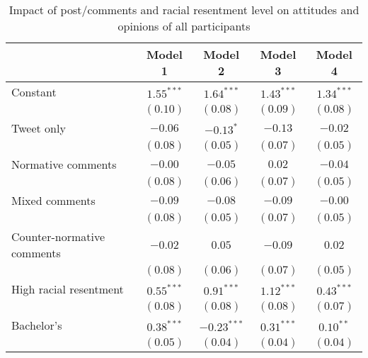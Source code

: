 
\begin{table}[h!]
\caption{Impact of post/comments and racial resentment level on attitudes and opinions of all participants}
\begin{center}
\begin{scriptsize}
\begin{tabular}{l c c c c}
\toprule
 & Model 1 & Model 2 & Model 3 & Model 4 \\
\midrule
Constant                                            & $1.55^{***}$  & $1.64^{***}$  & $1.43^{***}$  & $1.34^{***}$ \\
                                                    & $(0.10)$      & $(0.08)$      & $(0.09)$      & $(0.08)$     \\
Tweet only                                          & $-0.06$       & $-0.13^{*}$   & $-0.13$       & $-0.02$      \\
                                                    & $(0.08)$      & $(0.05)$      & $(0.07)$      & $(0.05)$     \\
Normative comments                                  & $-0.00$       & $-0.05$       & $0.02$        & $-0.04$      \\
                                                    & $(0.08)$      & $(0.06)$      & $(0.07)$      & $(0.05)$     \\
Mixed comments                                      & $-0.09$       & $-0.08$       & $-0.09$       & $-0.00$      \\
                                                    & $(0.08)$      & $(0.05)$      & $(0.07)$      & $(0.05)$     \\
Counter-normative comments                          & $-0.02$       & $0.05$        & $-0.09$       & $0.02$       \\
                                                    & $(0.08)$      & $(0.06)$      & $(0.07)$      & $(0.05)$     \\
High racial resentment                              & $0.55^{***}$  & $0.91^{***}$  & $1.12^{***}$  & $0.43^{***}$ \\
                                                    & $(0.08)$      & $(0.08)$      & $(0.08)$      & $(0.07)$     \\
Bachelor's                                          & $0.38^{***}$  & $-0.23^{***}$ & $0.31^{***}$  & $0.10^{**}$  \\
                                                    & $(0.05)$      & $(0.04)$      & $(0.04)$      & $(0.04)$     \\

\end{tabular}
\end{scriptsize}
\end{center}
\end{table}
